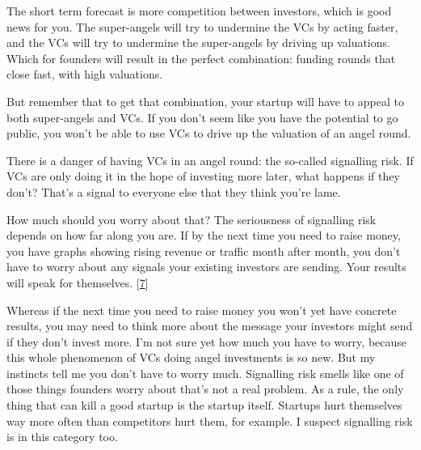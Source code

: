 The short term forecast is more
                    competition between investors, which is good news for you.
                    The super-angels will try to undermine the VCs by acting
                    faster, and the VCs will try to undermine the super-angels
                    by driving up valuations. Which for founders will result in
                    the perfect combination: funding rounds that close fast,
                    with high valuations.

But remember that to get
                    that combination, your startup will have to appeal to both
                    super-angels and VCs. If you don't seem like you have the
                    potential to go public, you won't be able to use VCs to
                    drive up the valuation of an angel round.

There
                    is a danger of having VCs in an angel round: the so-called
                    signalling risk. If VCs are only doing it in the hope of
                    investing more later, what happens if they don't? That's a
                    signal to everyone else that they think you're lame.

How
                    much should you worry about that? The seriousness of
                    signalling risk depends on how far along you are. If by the
                    next time you need to raise money, you have graphs showing
                    rising revenue or traffic month after month, you don't have
                    to worry about any signals your existing investors are
                    sending. Your results will speak for themselves.
                    [\href{\#f7n}{7}]

Whereas if the next time you need to raise
                    money you won't yet have concrete results, you may need to
                    think more about the message your investors might send if
                    they don't invest more. I'm not sure yet how much you have
                    to worry, because this whole phenomenon of VCs doing angel
                    investments is so new. But my instincts tell me you don't
                    have to worry much. Signalling risk smells like one of those
                    things founders worry about that's not a real problem. As a
                    rule, the only thing that can kill a good startup is the
                    startup itself. Startups hurt themselves way more often than
                    competitors hurt them, for example. I suspect signalling
                    risk is in this category too.

